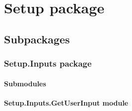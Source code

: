 \documentclass[letterpaper,10pt,english]{sphinxmanual}
\begin{document}
\section{Setup package}
\label{\detokenize{Setup:setup-package}}\label{\detokenize{Setup::doc}}

\subsection{Subpackages}
\label{\detokenize{Setup:subpackages}}
\sphinxstepscope


\subsubsection{Setup.Inputs package}
\label{\detokenize{Setup.Inputs:setup-inputs-package}}\label{\detokenize{Setup.Inputs::doc}}

\paragraph{Submodules}
\label{\detokenize{Setup.Inputs:submodules}}

\paragraph{Setup.Inputs.GetUserInput module}
\label{\detokenize{Setup.Inputs:module-Setup.Inputs.GetUserInput}}\label{\detokenize{Setup.Inputs:setup-inputs-getuserinput-module}}
\end{document}
